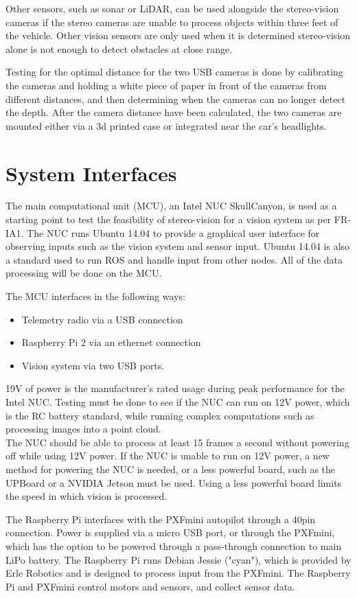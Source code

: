 \documentclass[compsoc,draftclsnofoot,onecolumn,10pt]{IEEEtran}
\begin{document}
Other sensors, such as sonar or LiDAR, can be used alongside the stereo-vision cameras if the stereo cameras are unable to process objects within three feet of the vehicle. Other vision sensors are only used when it is determined stereo-vision alone is not enough to detect obstacles at close range. \par
Testing for the optimal distance for the two USB cameras is done by calibrating the cameras and holding a white piece of paper in front of the cameras from different distances, and then determining when the cameras can no longer detect the depth. 
After the camera distance have been calculated, the two cameras are mounted either via a 3d printed case or integrated near the car's headlights. 


\section{System Interfaces}
The main computational unit (MCU), an Intel NUC SkullCanyon, is used as a starting point to test the feasibility of stereo-vision for a vision system as per FR-IA1. The NUC runs Ubuntu 14.04 to provide a graphical user interface for observing inputs such as the vision system and sensor input. Ubuntu 14.04 is also a standard used to run ROS and handle input from other nodes. 
All of the data processing will be done on the MCU. \par
The MCU interfaces in the following ways:
\begin{itemize}
\item Telemetry radio via a USB connection
\item Raspberry Pi 2 via an ethernet connection
\item Vision system via two USB ports. 
\end{itemize}
19V of power is the manufacturer's rated usage during peak performance for the Intel NUC. Testing must be done to see if the NUC can run on 12V power, which is the RC battery standard, while running complex computations such as processing images into a point cloud. \\
The NUC should be able to process at least 15 frames a second without powering off while using 12V power. 
If the NUC is unable to run on 12V power, a new method for powering the NUC is needed, or a less powerful board, such as the UPBoard or a NVIDIA Jetson must be used. Using a less powerful board limits the speed in which vision is processed.  \par

The Raspberry Pi interfaces with the PXFmini autopilot through a 40pin connection. Power is supplied via a micro USB port, or through the PXFmini, which has the option to be powered through a pass-through connection to main LiPo battery. The Raspberry Pi runs Debian Jessie ("cyan"), which is provided by Erle Robotics and is designed to process input from the PXFmini. The Raspberry Pi and PXFmini control motors and sensors, and collect sensor data. \par
\end{document}
